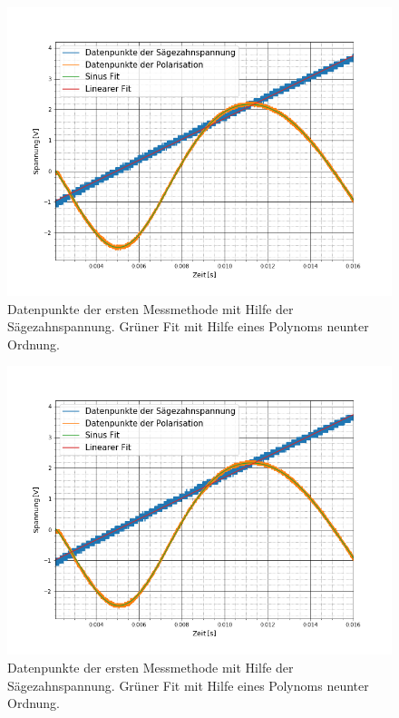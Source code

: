 \begin{figure}[ht]
	\includegraphics[scale=0.5]{Bild/V1_9}
	\centering
	\caption[Plot zu Versuchsteil 1 Nr.9]{Datenpunkte der ersten Messmethode mit Hilfe der Sägezahnspannung. Grüner Fit mit Hilfe eines Polynoms neunter Ordnung.}
\end{figure}
\begin{figure}[ht]
	\includegraphics[scale=0.5]{Bild/V1_10}
	\centering
	\caption[Plot zu Versuchsteil 1 Nr.10]{Datenpunkte der ersten Messmethode mit Hilfe der Sägezahnspannung. Grüner Fit mit Hilfe eines Polynoms neunter Ordnung.}
\end{figure}
